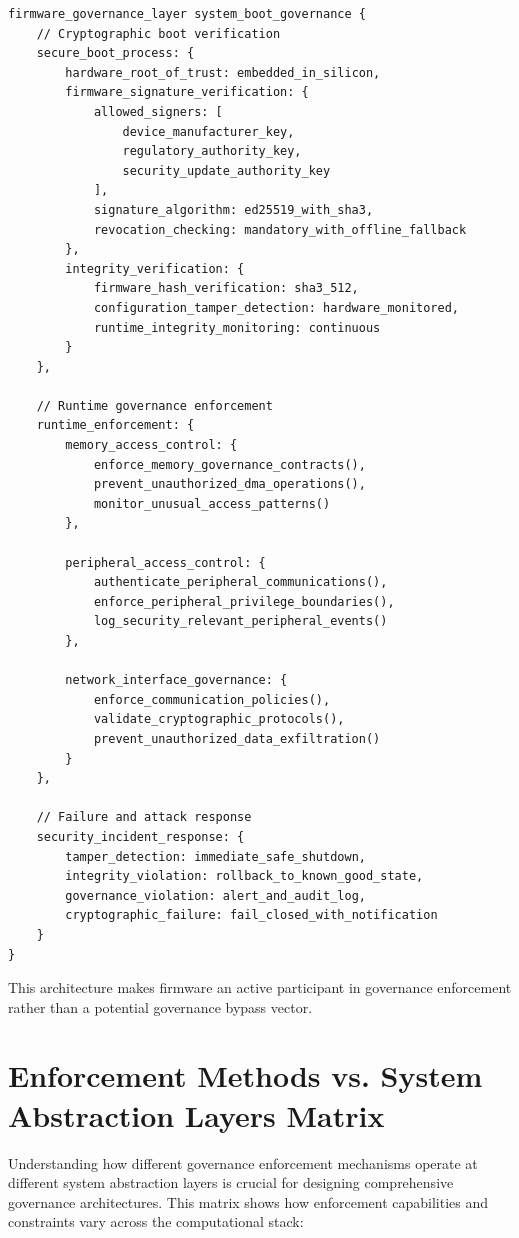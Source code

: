 \begin{lstlisting}[language=rift, caption=Governance-Enforcing Firmware Architecture]
firmware_governance_layer system_boot_governance {
    // Cryptographic boot verification
    secure_boot_process: {
        hardware_root_of_trust: embedded_in_silicon,
        firmware_signature_verification: {
            allowed_signers: [
                device_manufacturer_key,
                regulatory_authority_key,
                security_update_authority_key
            ],
            signature_algorithm: ed25519_with_sha3,
            revocation_checking: mandatory_with_offline_fallback
        },
        integrity_verification: {
            firmware_hash_verification: sha3_512,
            configuration_tamper_detection: hardware_monitored,
            runtime_integrity_monitoring: continuous
        }
    },
    
    // Runtime governance enforcement
    runtime_enforcement: {
        memory_access_control: {
            enforce_memory_governance_contracts(),
            prevent_unauthorized_dma_operations(),
            monitor_unusual_access_patterns()
        },
        
        peripheral_access_control: {
            authenticate_peripheral_communications(),
            enforce_peripheral_privilege_boundaries(),
            log_security_relevant_peripheral_events()
        },
        
        network_interface_governance: {
            enforce_communication_policies(),
            validate_cryptographic_protocols(),
            prevent_unauthorized_data_exfiltration()
        }
    },
    
    // Failure and attack response
    security_incident_response: {
        tamper_detection: immediate_safe_shutdown,
        integrity_violation: rollback_to_known_good_state,
        governance_violation: alert_and_audit_log,
        cryptographic_failure: fail_closed_with_notification
    }
}
\end{lstlisting}

This architecture makes firmware an active participant in governance enforcement rather than a potential governance bypass vector.

\section{Enforcement Methods vs. System Abstraction Layers Matrix}

Understanding how different governance enforcement mechanisms operate at different system abstraction layers is crucial for designing comprehensive governance architectures. This matrix shows how enforcement capabilities and constraints vary across the computational stack:

